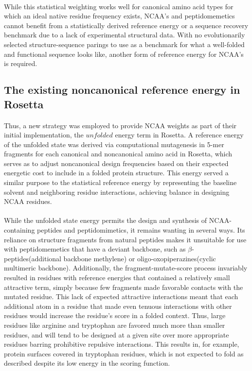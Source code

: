 \paragraph{}
While this statistical weighting works well for canonical amino acid types for which an ideal native residue frequency exists, NCAA's and peptidomemetics cannot benefit from a statistically derived reference energy or a sequence recovery benchmark due to a lack of experimental structural data. With no evolutionarily selected structure-sequence parings to use as a benchmark for what a well-folded and functional sequence looks like, another form of reference energy for NCAA's is required.

\subsection{The existing noncanonical reference energy in Rosetta}

\paragraph{}
Thus, a new strategy was employed to provide NCAA weights as part of their initial implementation, the $unfolded$ energy term in Rosetta\cite{renfrew_incorporation_2012}.
A reference energy of the unfolded state was derived via computational mutagenesis in 5-mer fragments for each canonical and noncanonical amino acid in Rosetta, which serves as to adjust noncanonical design frequencies based on their expected energetic cost to include in a folded protein structure.
This energy served a similar purpose to the statistical reference energy by representing the baseline solvent and neighboring residue interactions, achieving balance in designing NCAA residues.

\paragraph{}
While the unfolded state energy permits the design and synthesis of NCAA-containing peptides and peptidomimetics\cite{lao_rational_2014,drew_adding_2013}, it remains wanting in several ways.
Its reliance on structure fragments from natural peptides makes it unsuitable for use with peptidomemetics that have a deviant backbone, such as $\beta$-peptides(additional backbone methylene) or oligo-oxopiperazines(cyclic multimeric backbone).
Additionally, the fragment-mutate-score process invariably resulted in residues with reference energies that contained a relatively small attractive term, simply because few fragments made favorable contacts with the mutated residue.
This lack of expected attractive interactions meant that each additional atom in a residue that made even tenuous interactions with other residues would increase the residue's score in a folded context.
Thus, large residues like arginine and tryptophan are favored much more than smaller residues, and will tend to be designed at a given site over more appropriate residues barring prohibitive repulsive interactions.
This results in, for example, protein surfaces covered in tryptophan residues, which is not expected to fold as described despite its low energy in the scoring function.

